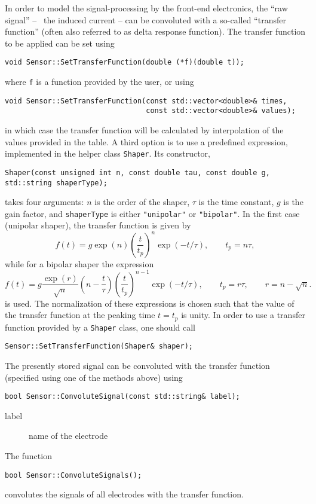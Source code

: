 In order to model the signal-processing by the front-end electronics, the 
``raw signal'' -- \ie~the induced current -- 
can be convoluted with a so-called ``transfer function'' (often also referred 
to as delta response function). 
The transfer function to be applied can be set using
\begin{lstlisting}
void Sensor::SetTransferFunction(double (*f)(double t));
\end{lstlisting}
where \texttt{f} is a function provided by the user, or using
\begin{lstlisting}
void Sensor::SetTransferFunction(const std::vector<double>& times,
                                 const std::vector<double>& values);
\end{lstlisting}
in which case the transfer function will be calculated by 
interpolation of the values provided in the table.
A third option is to use a predefined expression, implemented in 
the helper class \texttt{Shaper}. Its constructor,
\begin{lstlisting}
Shaper(const unsigned int n, const double tau, const double g, std::string shaperType);
\end{lstlisting}
takes four arguments: $n$ is the order of the shaper, 
$\tau$ is the time constant, $g$ is the gain factor, 
and \texttt{shaperType} is either \texttt{"unipolar"} or \texttt{"bipolar"}.
In the first case (unipolar shaper), the transfer function is given by
\begin{equation*}
  f\left(t\right) = g \exp\left(n\right)\left(\frac{t}{t_{p}}\right)^{n}
                    \exp\left(-t / \tau\right), \qquad t_{p} = n\tau,
\end{equation*} 
while for a bipolar shaper the expression
\begin{equation*}
  f\left(t\right) = g \frac{\exp\left(r\right)}{\sqrt{n}} \left(n - \frac{t}{\tau}\right)
                    \left(\frac{t}{t_{p}}\right)^{n - 1} 
                    \exp\left(-t / \tau\right), \qquad t_{p} = r\tau, \qquad r = n - \sqrt{n}.
\end{equation*}
is used. The normalization of these expressions is chosen such that the  
value of the transfer function at the peaking time $t = t_{p}$ is unity.
In order to use a transfer function provided by a \texttt{Shaper} class,
one should call
\begin{lstlisting}
Sensor::SetTransferFunction(Shaper& shaper);
\end{lstlisting}

The presently stored signal can be convoluted with the 
transfer function (specified using one of the methods above) using 
\begin{lstlisting}
bool Sensor::ConvoluteSignal(const std::string& label);
\end{lstlisting}
\begin{description}
  \item[label] name of the electrode
\end{description}
The function
\begin{lstlisting}
bool Sensor::ConvoluteSignals();
\end{lstlisting}
convolutes the signals of all electrodes with the transfer function.

